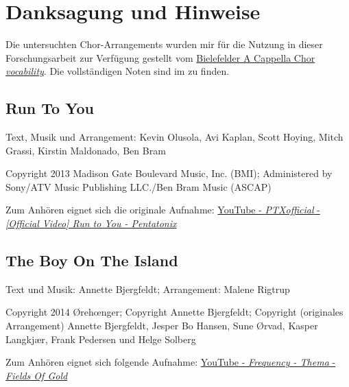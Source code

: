 \chapter*{Danksagung und Hinweise}
\label{chap:Danksagung und Hinweise}

Die untersuchten Chor-Arrangements wurden mir für die Nutzung in dieser Forschungsarbeit zur Verfügung gestellt vom \href{https://www.vocability.de/medien/anhoeren/}{Bielefelder A Cappella Chor \textit{vocability}}. Die vollständigen Noten sind im  zu finden.

\section*{Run To You}

Text, Musik und Arrangement: Kevin Olusola, Avi Kaplan, Scott Hoying, Mitch Grassi, Kirstin Maldonado, Ben Bram

Copyright 2013 Madison Gate Boulevard Music, Inc. (BMI); Administered by Sony/ATV Music Publishing LLC./Ben Bram Music (ASCAP)

Zum Anhören eignet sich die originale Aufnahme: \href{https://www.youtube.com/watch?v=sp7PS_UN8Lo}{YouTube - \textit{PTXofficial} - \textit{[Official Video] Run to You - Pentatonix
}}

\section*{The Boy On The Island}

Text und Musik: Annette Bjergfeldt; Arrangement: Malene Rigtrup

Copyright 2014 Ørehœnger; Copyright Annette Bjergfeldt; Copyright (originales Arrangement) Annette Bjergfeldt, Jesper Bo Hansen, Sune Ørvad, Kasper Langkjær, Frank Pedersen und Helge Solberg

Zum Anhören eignet sich folgende Aufnahme: \href{https://www.youtube.com/watch?v=3AiiiNIo9hk}{YouTube - \textit{Frequency - Thema} - \textit{Fields Of Gold}}